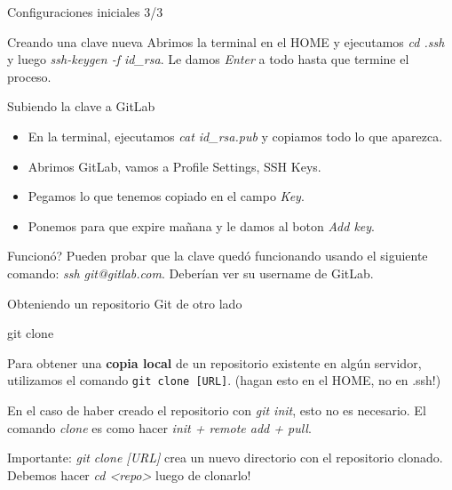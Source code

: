 \begin{frame}{Configuraciones iniciales 3/3}
  \begin{block}{Creando una clave nueva}
		Abrimos la terminal en el HOME y ejecutamos \textit{cd .ssh} y luego \textit{ssh-keygen -f id\_rsa}. Le damos \textit{Enter} a todo hasta que termine el proceso.
	\end{block}
  \pause
  \begin{block}{Subiendo la clave a GitLab}
		\begin{itemize}
		\item En la terminal, ejecutamos \textit{cat id\_rsa.pub} y copiamos todo lo que aparezca.
      \item Abrimos GitLab, vamos a Profile Settings, SSH Keys.
      \item Pegamos lo que tenemos copiado en el campo \textit{Key}.
      \item Ponemos para que expire mañana y le damos al boton \textit{Add key}.
		\end{itemize}
	\end{block}
    \pause
    \begin{block}{Funcionó?}
        Pueden probar que la clave quedó funcionando usando el siguiente comando: \textit{ssh git@gitlab.com}. Deberían ver su username de GitLab.
    \end{block}

\end{frame}

\begin{frame}[t]{Obteniendo un repositorio Git de otro lado}
    \begin{comando}
        git clone
    \end{comando}

    \begin{block}{}
        Para obtener una \textbf{copia local} de un repositorio existente en algún servidor,
        utilizamos el comando \texttt{git clone [URL]}. (hagan esto en el HOME, no en .ssh!)

        En el caso de haber creado el repositorio con \textit{git init}, esto no es necesario. El comando \textit{clone} es como hacer \textit{init + remote add + pull}.
    \end{block}
    \begin{block}{}
        Importante: \textit{git clone [URL]} crea un nuevo directorio con el
        repositorio clonado. Debemos hacer \textit{cd <repo>} luego de clonarlo!
    \end{block}
\end{frame}

